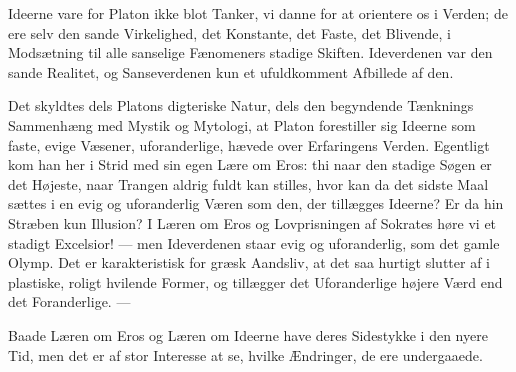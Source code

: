 \documentclass[12pt,a4paper,openany]{book}
\newcommand{\opage}[1]{\marginnote{\footnotesize\textit{[#1]}}}
\begin{document}
Ideerne vare for Platon ikke blot Tanker, vi danne for at
orientere os i Verden; de ere selv den sande Virkelighed, det
Konstante, det Faste, det Blivende, i Modsætning til alle sanselige
Fænomeners stadige Skiften. Ideverdenen var den sande
Realitet, og Sanseverdenen kun et ufuldkomment Afbillede
af den.

Det skyldtes dels Platons digteriske Natur, dels den begyndende
Tænknings Sammenhæng med Mystik og Mytologi,
at Platon forestiller sig Ideerne som faste, evige Væsener, uforanderlige,
hævede over Erfaringens Verden. Egentligt kom han
her i Strid med sin egen Lære om Eros: thi naar den stadige
\setcounter{footnote}{0}%
\opage{90}Søgen er det Højeste, naar Trangen aldrig fuldt kan stilles, hvor
kan da det sidste Maal sættes i en evig og uforanderlig Væren
som den, der tillægges Ideerne? Er da hin Stræben kun Illusion?
I Læren om Eros og Lovprisningen af Sokrates høre
vi et stadigt Excelsior! --- men Ideverdenen staar evig og uforanderlig,
som det gamle Olymp. Det er karakteristisk for græsk
Aandsliv, at det saa hurtigt slutter af i plastiske, roligt hvilende
Former, og tillægger det Uforanderlige højere Værd end det
Foranderlige. ---

Baade Læren om Eros og Læren om Ideerne have deres
Sidestykke i den nyere Tid, men det er af stor Interesse at se,
hvilke Ændringer, de ere undergaaede.
\end{document}
